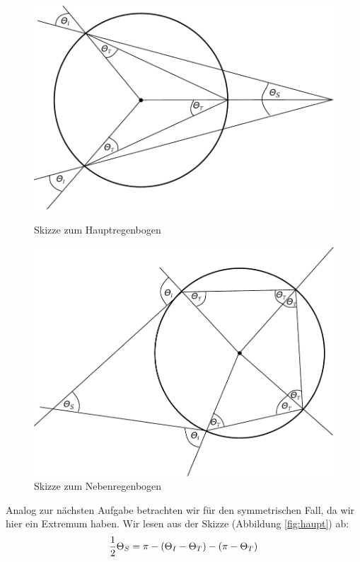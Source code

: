 \documentclass[11pt, ngerman, fleqn]{article}
\newcommand{\half}{\frac 12}
\begin{document}
\begin{figure}
	\centering
	\begin{minipage}{0.49\textwidth}
		\centering
		\includegraphics[width=\textwidth]{H2-Hauptregenbogen.pdf}
		\caption{Skizze zum Hauptregenbogen}
		\label{fig:haupt}
	\end{minipage}
	\begin{minipage}{0.49\textwidth}
		\centering
		\includegraphics[width=\textwidth]{H2-Nebenregenbogen.pdf}
		\caption{Skizze zum Nebenregenbogen}
		\label{fig:neben}
	\end{minipage}
\end{figure}

Analog zur nächsten Aufgabe betrachten wir für den symmetrischen Fall, da wir
hier ein Extremum haben. Wir lesen aus der Skizze (Abbildung \ref{fig:haupt})
ab:
\[
	\half \Theta_S = \pi - \del{\Theta_I - \Theta_T} - \del{\pi - \Theta_T}
\]
\end{document}
